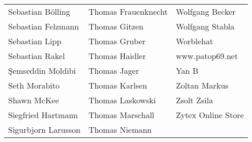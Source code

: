 \begin{small}
\begin{tabular}{p{4cm}p{4cm}p{4cm}}
Sebastian Bölling & Thomas Frauenknecht & Wolfgang Becker \\
Sebastian Felzmann & Thomas Gitzen & Wolfgang Stabla \\
Sebastian Lipp & Thomas Gruber & Worblehat \\
Sebastian Rakel & Thomas Haidler & www.patop69.net \\
Şemseddin Moldibi & Thomas Jager & Yan B \\
Seth Morabito & Thomas Karlsen & Zoltan Markus \\
Shawn McKee & Thomas Laskowski & Zsolt Zsila \\
Siegfried Hartmann & Thomas Marschall & Zytex Online Store \\
Sigurbjorn Larusson & Thomas Niemann &  \\
\end{tabular}
\end{small}
\ifdefined\printmanual
\else
{}
\fi
